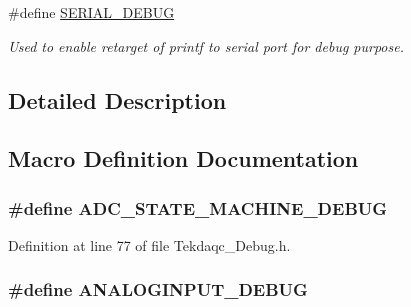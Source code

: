 \begin{DoxyCompactItemize}
\#define \hyperlink{group__driver__debug_gac237b6870305a0bf8f89e76f65caf732}{S\-E\-R\-I\-A\-L\-\_\-\-D\-E\-B\-U\-G}
\begin{DoxyCompactList}\small\item\em Used to enable retarget of printf to serial port for debug purpose. \end{DoxyCompactList}\end{DoxyCompactItemize}


\subsection{Detailed Description}


\subsection{Macro Definition Documentation}
\hypertarget{group__driver__debug_ga10ae9c17d0997dd17e63f7a2ae013d8b}{
\subsubsection[{A\-D\-C\-\_\-\-S\-T\-A\-T\-E\-\_\-\-M\-A\-C\-H\-I\-N\-E\-\_\-\-D\-E\-B\-U\-G}]{\setlength{\rightskip}{0pt plus 5cm}\#define A\-D\-C\-\_\-\-S\-T\-A\-T\-E\-\_\-\-M\-A\-C\-H\-I\-N\-E\-\_\-\-D\-E\-B\-U\-G}}\label{group__driver__debug_ga10ae9c17d0997dd17e63f7a2ae013d8b}


Definition at line 77 of file Tekdaqc\-\_\-\-Debug.\-h.

\hypertarget{group__driver__debug_gab86cc70e579e44fab34deffda6178284}{
\subsubsection[{A\-N\-A\-L\-O\-G\-I\-N\-P\-U\-T\-\_\-\-D\-E\-B\-U\-G}]{\setlength{\rightskip}{0pt plus 5cm}\#define A\-N\-A\-L\-O\-G\-I\-N\-P\-U\-T\-\_\-\-D\-E\-B\-U\-G}}\label{group__driver__debug_gab86cc70e579e44fab34deffda6178284}


